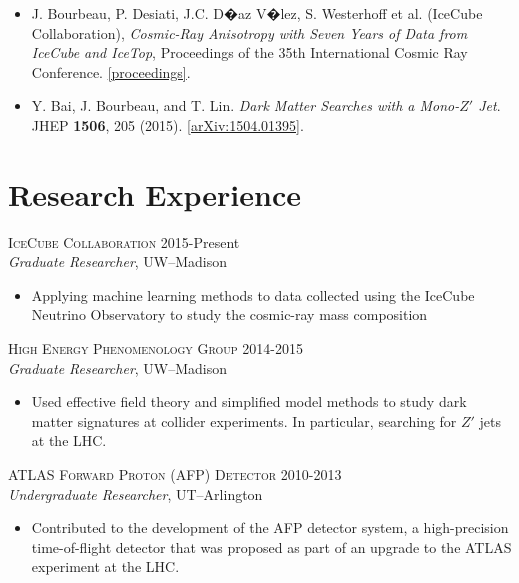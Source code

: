 \documentclass[line,margin]{res}
\begin{document}
\begin{resume}
\begin{itemize}
	\item J. Bourbeau, P. Desiati, J.C. D�az V�lez, S. Westerhoff et al. (IceCube Collaboration),
		{\it Cosmic-Ray Anisotropy with Seven Years of Data from IceCube and IceTop},
		Proceedings of the 35th International Cosmic Ray Conference.
	\href{https://pos.sissa.it/301/474/pdf}{[proceedings]}.

	\item Y. Bai, J. Bourbeau, and T. Lin. {\it Dark Matter Searches with a Mono-$Z'$ Jet}. JHEP {\bf 1506}, 205 (2015).
	\href{http://arxiv.org/pdf/1504.01395.pdf}{[arXiv:1504.01395]}.

\end{itemize}

\section{\sc Research Experience}
	\textsc{IceCube Collaboration}  \hfill 2015-Present \\
	{\it Graduate Researcher}, UW--Madison
		\begin{itemize}
		\item Applying machine learning methods to data collected using the IceCube Neutrino Observatory to study the cosmic-ray mass composition
		\end{itemize}

	\textsc{High Energy Phenomenology Group}  \hfill 2014-2015 \\
	{\it Graduate Researcher}, UW--Madison
		\begin{itemize}
		\item Used effective field theory and simplified model methods to study dark matter signatures at collider experiments. In particular, searching for $Z'$ jets at the LHC.
		\end{itemize}


	\textsc{ATLAS Forward Proton  (AFP) Detector} \hfill 2010-2013 \\
	{\it Undergraduate Researcher}, UT--Arlington
		\begin{itemize}
		\item Contributed to the development of the AFP detector system, a high-precision time-of-flight detector that was proposed as part of an upgrade to the ATLAS experiment at the LHC.
		\end{itemize}


\end{resume}
\end{document}
